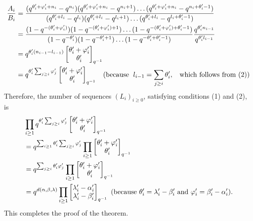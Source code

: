 \begin{equation}\label{A/B}
\begin{split}
     \frac{A_i}{B_i}&=\frac{(q^{\theta_i^\prime+\varphi_i^\prime+n_{i}}-q^{n_{i}})(q^{\theta_i^\prime+\varphi_i^\prime+n_{i}}-q^{n_{i}+1})\dots(q^{\theta_i^\prime+\varphi_i^\prime+n_{i}}-q^{n_{i}+\theta_i^\prime-1})}{(q^{\theta_i^\prime+l_{i}}-q^{l_{i}})(q^{\theta_i^\prime+l_{i}}-q^{l_{i}+1})\dots(q^{\theta_i^\prime+l_{i}}-q^{l_{i}+\theta_i^\prime-1})}\\
     &=\frac{(1-q^{-(\theta_i^\prime+\varphi_i^\prime)})(1-q^{-(\theta_i^\prime+\varphi_i^\prime)+1})\dots(1-q^{-(\theta_i^\prime+\varphi_i^\prime)+\theta_i^\prime-1})}{(1-q^{-\theta_i^\prime})(1-q^{-\theta_i^\prime+1})\dots(1-q^{-\theta_i^\prime+\theta_i^\prime-1})}\frac{q^{\theta_i^\prime n_{i-1}}}{q^{\theta_i^\prime l_{i-1}}}\\
     &=q^{\theta_i^\prime(n_{i-1}-l_{i-1})}\begin{bmatrix} \theta_i^\prime+\varphi_i^\prime\\\theta_i^\prime\end{bmatrix}_{q^{-1}}\\
     &=q^{\theta_i^\prime\sum_{j\geq i}\varphi_j^\prime}\begin{bmatrix} \theta_i^\prime+\varphi_i^\prime\\\theta_i^\prime\end{bmatrix}_{q^{-1}}\;\;\text{ (because }\;l_{i-1}=\sum_{j\geq i}\theta_i^\prime,\;\;\text{ which follows from } (2))
\end{split}
\end{equation}
Therefore, the number of sequences $(L_i)_{i\geq0}$, satisfying conditions (1) and (2), is
\begin{equation}
\begin{split}
       &\prod_{i\geq1}q^{\theta_i^\prime\sum_{j\geq i}\varphi_j^\prime}\begin{bmatrix} \theta_i^\prime+\varphi_i^\prime\\\theta_i^\prime\end{bmatrix}_{q^{-1}}\\
       &=q^{\sum_{i\geq1}\theta_i^\prime\sum_{j\geq i}\varphi_j^\prime}\prod_{i\geq1}\begin{bmatrix} \theta_i^\prime+\varphi_i^\prime\\\theta_i^\prime\end{bmatrix}_{q^{-1}}\\
       &=q^{\sum_{j\geq i}\theta_i^\prime\varphi_j^\prime}\prod_{i\geq1}\begin{bmatrix} \theta_i^\prime+\varphi_i^\prime\\\theta_i^\prime\end{bmatrix}_{q^{-1}}\\
       &=q^{d(\alpha,\beta,\lambda)}\prod_{i\geq1}\begin{bmatrix} \lambda_i^\prime-\alpha_i^\prime\\\lambda_i^\prime-\beta_i^\prime\end{bmatrix}_{q^{-1}}\text{ (because }\theta_i^\prime=\lambda_i^\prime-\beta_i^\prime\text{ and }\varphi_i^\prime=\beta_i^\prime-\alpha_i^\prime).
\end{split}
\end{equation}
This completes the proof of the theorem.\par


